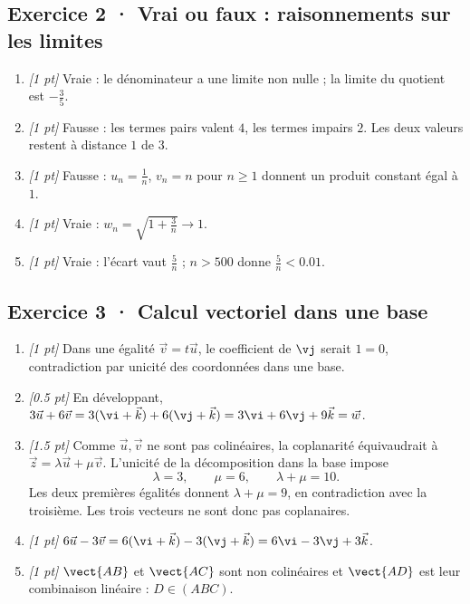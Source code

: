 \subsection*{Exercice 2 · Vrai ou faux : raisonnements sur les limites}\begin{enumerate}

\item \textit{[1 pt]} Vraie : le dénominateur a une limite non nulle ; la limite du quotient est $-\frac{3}{5}$.

\item \textit{[1 pt]} Fausse : les termes pairs valent $4$, les termes impairs $2$. Les deux valeurs restent à distance $1$ de $3$.

\item \textit{[1 pt]} Fausse : $u_n=\frac{1}{n}$, $v_n=n$ pour $n\ge1$ donnent un produit constant égal à $1$.

\item \textit{[1 pt]} Vraie : $w_n=\sqrt{1+\frac{3}{n}}\to1$.

\item \textit{[1 pt]} Vraie : l'écart vaut $\frac{5}{n}$ ; $n>500$ donne $\frac{5}{n}<\num{0,01}$.

\end{enumerate}

\subsection*{Exercice 3 · Calcul vectoriel dans une base}\begin{enumerate}

\item \textit{[1 pt]} Dans une égalité $\vec v=t\vec u$, le coefficient de $\vj $ serait $1=0$, contradiction par unicité des coordonnées dans une base.

\item \textit{[\num{0,5} pt]} En développant, $3\vec u+6\vec v=3(\vi +\vec k)+6(\vj +\vec k)=3\vi +6\vj +9\vec k=\vec w$.

\item \textit{[\num{1,5} pt]} Comme $\vec u,\vec v$ ne sont pas colinéaires, la coplanarité équivaudrait à $\vec z=\lambda\vec u+\mu\vec v$. L'unicité de la décomposition dans la base impose
\[\lambda=3,\qquad\mu=6,\qquad\lambda+\mu=10.\]
Les deux premières égalités donnent $\lambda+\mu=9$, en contradiction avec la troisième. Les trois vecteurs ne sont donc pas coplanaires.

\item \textit{[1 pt]} $6\vec u-3\vec v=6(\vi +\vec k)-3(\vj +\vec k)=6\vi -3\vj +3\vec k$.

\item \textit{[1 pt]} $\vect{AB}$ et $\vect{AC}$ sont non colinéaires et $\vect{AD}$ est leur combinaison linéaire : $D\in(ABC)$.

\end{enumerate}

